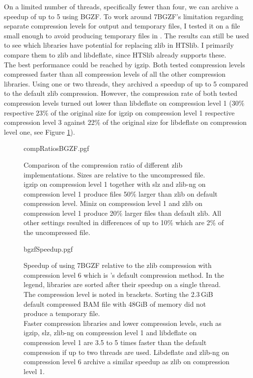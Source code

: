 On a limited number of threads, specifically fewer than four, we can archive a speedup of up to 5 using BGZF. To work around 7BGZF's limitation regarding separate compression levels for output and temporary files, I tested it on a file small enough to avoid producing temporary files in \sort. The results can still be used to see which libraries have potential for replacing zlib in HTSlib. I primarily compare them to zlib and libdeflate, since HTSlib already supports these.\\
The best performance could be reached by igzip. Both tested compression levels compressed faster than all compression levels of all the other compression libraries. Using one or two threads, they archived a speedup of up to 5 compared to the default zlib compression. However, the compression rate of both tested compression levels turned out lower than libdeflate on compression level 1 (30\% respective 23\% of the original size for igzip on compression level 1 respective compression level 3 against 22\% of the original size for libdeflate on compression level one, see Figure \ref{fig:bgzfComps}). \\
\begin{figure}[!htb]
        {compRatiosBGZF.pgf}
    \caption{Comparison of the compression ratio of different zlib implementations. Sizes are relative to the uncompressed file. \\
    igzip on compression level 1 together with slz and zlib-ng on compression level 1 produce files 50\% larger than zlib on default compression level. Miniz on compression level 1 and zlib on compression level 1 produce 20\% larger files than default zlib. All other settings resulted in differences of up to 10\% which are 2\% of the uncompressed file.}
    \label{fig:bgzfComps}
\end{figure}
\begin{figure}[!htb]
        {bgzfSpeedup.pgf}
    \caption{Speedup of \sort using 7BGZF relative to the zlib compression with compression level 6 which is \sort's default compression method. In the legend, libraries are sorted after their speedup on a single thread. The compression level is noted in brackets. Sorting the 2.3\,GiB default compressed BAM file with 48GiB of memory did not produce a temporary file. \\
    Faster compression libraries and lower compression levels, such as igzip, slz, zlib-ng on compression level 1 and libdeflate on compression level 1 are 3.5 to 5 times faster than the default compression if up to two threads are used. Libdeflate and zlib-ng on compression level 6 archive a similar speedup as zlib on compression level 1.}
    \label{fig:bgzfspeed}
\end{figure}
